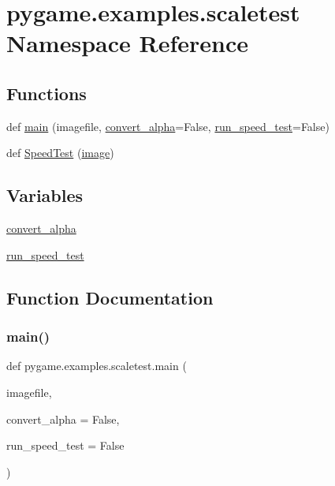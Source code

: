 \hypertarget{namespacepygame_1_1examples_1_1scaletest}{}\section{pygame.\+examples.\+scaletest Namespace Reference}
\label{namespacepygame_1_1examples_1_1scaletest}
\subsection*{Functions}
\begin{DoxyCompactItemize}
\item 
def \hyperlink{namespacepygame_1_1examples_1_1scaletest_aacaf60ffdad70292fa41f1b1db2302b8}{main} (imagefile, \hyperlink{namespacepygame_1_1examples_1_1scaletest_a23a539fae18c0f059c57083224ee5af0}{convert\+\_\+alpha}=False, \hyperlink{namespacepygame_1_1examples_1_1scaletest_ab265e3bb5b85321721c4f4f58b93df4d}{run\+\_\+speed\+\_\+test}=False)
\item 
def \hyperlink{namespacepygame_1_1examples_1_1scaletest_a0cbd158af037ef213ad3613bad345ebc}{Speed\+Test} (\hyperlink{namespacepygame_a0d457af554c5ed9426728f64e80cd688}{image})
\end{DoxyCompactItemize}
\subsection*{Variables}
\begin{DoxyCompactItemize}
\item 
\hyperlink{namespacepygame_1_1examples_1_1scaletest_a23a539fae18c0f059c57083224ee5af0}{convert\+\_\+alpha}
\item 
\hyperlink{namespacepygame_1_1examples_1_1scaletest_ab265e3bb5b85321721c4f4f58b93df4d}{run\+\_\+speed\+\_\+test}
\end{DoxyCompactItemize}


\subsection{Function Documentation}
\mbox{\label{namespacepygame_1_1examples_1_1scaletest_aacaf60ffdad70292fa41f1b1db2302b8}} 
\subsubsection{\texorpdfstring{main()}{main()}}
{\footnotesize\ttfamily def pygame.\+examples.\+scaletest.\+main (\begin{DoxyParamCaption}\item[{}]{imagefile,  }\item[{}]{convert\+\_\+alpha = {\ttfamily False},  }\item[{}]{run\+\_\+speed\+\_\+test = {\ttfamily False} }\end{DoxyParamCaption})}

